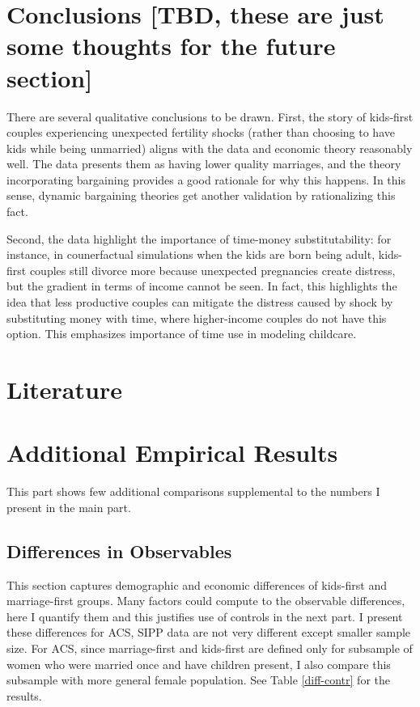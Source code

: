 \documentclass[12pt,letter]{article}
\begin{document}
\section{Conclusions [TBD, these are just some thoughts for the future section]}
There are several qualitative conclusions to be drawn. First, the story of kids-first couples experiencing unexpected fertility shocks (rather than choosing to have kids while being unmarried) aligns with the data and economic theory reasonably well. The data presents them as having lower quality marriages, and the theory incorporating bargaining provides a good rationale for why this happens. In this sense, dynamic bargaining theories get another validation by rationalizing this fact.

Second, the data highlight the importance of time-money substitutability: for instance, in counerfactual simulations when the kids are born being adult, kids-first couples still divorce more because unexpected pregnancies create distress, but the gradient in terms of income cannot be seen. In fact, this highlights the idea that less productive couples can mitigate the distress caused by shock by substituting money with time, where higher-income couples do not have this option. This emphasizes importance of time use in modeling childcare.
\clearpage

\section*{Literature}



\newpage
\appendix
\section{Additional Empirical Results\label{extra-comparisons}}
This part shows few additional comparisons supplemental to the numbers I present in the main part.

\subsection{Differences in Observables\label{comp-diff-appendix}}
This section captures demographic and economic differences of kids-first and marriage-first groups. Many factors could compute to the observable differences, here I quantify them and this justifies use of controls in the next part. I present these differences for ACS, SIPP data are not very different except smaller sample size. For ACS, since marriage-first and kids-first are defined only for subsample of women who were married once and have children present, I also compare this subsample with more general female population. See Table \ref{diff-contr} for the results.
\end{document}

